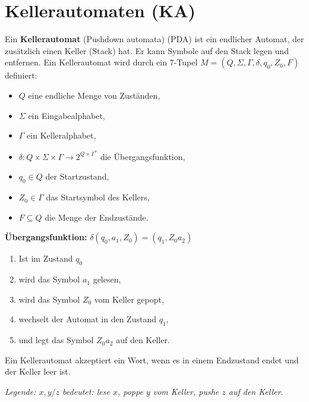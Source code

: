 \documentclass{article}
\begin{document}
\section*{Kellerautomaten (KA)}
\begin{minipage}[t]{0.45\textwidth}
    Ein \textbf{Kellerautomat} (Pushdown automata) (PDA) ist ein endlicher Automat, der zusätzlich einen Keller (Stack) hat. 
    Er kann Symbole auf den Stack legen und entfernen. Ein Kellerautomat wird durch ein 7-Tupel $M = (Q, \Sigma, \Gamma, \delta, q_0, Z_0, F)$ definiert:
    \begin{itemize}
        \item $Q$ eine endliche Menge von Zuständen,
        \item $\Sigma$ ein Eingabealphabet,
        \item $\Gamma$ ein Kelleralphabet,
        \item $\delta: Q \times \Sigma \times \Gamma \to 2^{Q \times \Gamma^*}$ die Übergangsfunktion,
        \item $q_0 \in Q$ der Startzustand,
        \item $Z_0 \in \Gamma$ das Startsymbol des Kellers,
        \item $F \subseteq Q$ die Menge der Endzustände.
    \end{itemize}
    \textbf{Übergangsfunktion:} $\delta(q_0, a_1, Z_0) = (q_1, Z_0 a_2)$
    \begin{enumerate}
        \item Ist im Zustand $q_0$ 
        \item wird das Symbol $a_1$ gelesen,
        \item wird das Symbol $Z_0$ vom Keller gepopt,
        \item wechselt der Automat in den Zustand $q_1$,
        \item und legt das Symbol $Z_0 a_2$ auf den Keller.
    \end{enumerate}
    
    Ein Kellerautomat akzeptiert ein Wort, wenn es in einem Endzustand endet und der Keller leer ist.
\end{minipage}
\hfill
\begin{minipage}[t]{0.45\textwidth}
    \begin{center}
    \usetikzlibrary{automata, positioning}
    \end{center}
    \textit{Legende: $x, y/z$ bedeutet: lese $x$, poppe $y$ vom Keller, pushe $z$ auf den Keller.}
\end{minipage}
\end{document}
